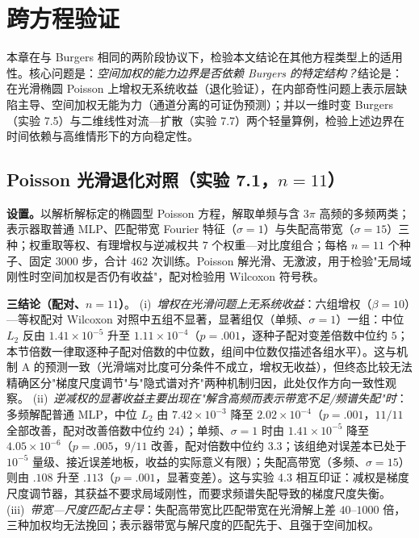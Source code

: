 \documentclass[fontset=windows,11pt]{ctexart}
\numberwithin{equation}{section}
\begin{document}
\FloatBarrier

\section{跨方程验证}\label{sec:crosseqn}

本章在与 Burgers 相同的两阶段协议下，检验本文结论在其他方程类型上的适用性。核心问题是：\emph{空间加权的能力边界是否依赖 Burgers 的特定结构？}结论是：在光滑椭圆 Poisson 上增权无系统收益（退化验证），在内部奇性问题上表示层缺陷主导、空间加权无能为力（通道分离的可证伪预测）；并以一维时变 Burgers（实验 7.5）与二维线性对流—扩散（实验 7.7）两个轻量算例，检验上述边界在时间依赖与高维情形下的方向稳定性。

\subsection{Poisson 光滑退化对照（实验 7.1，$n=11$）}\label{sec:s2a}

\textbf{设置。}以解析解标定的椭圆型 Poisson 方程，解取单频与含 $3\pi$ 高频的多频两类；表示器取普通 MLP、匹配带宽 Fourier 特征（$\sigma=1$）与失配高带宽（$\sigma=15$）三种；权重取等权、有理增权与逆减权共 $7$ 个权重—对比度组合；每格 $n=11$ 个种子、固定 $3000$ 步，合计 $462$ 次训练。Poisson 解光滑、无激波，用于检验"无局域刚性时空间加权是否仍有收益"，配对检验用 Wilcoxon 符号秩。

\noindent\textbf{三结论（配对、$n=11$）}。
(i)~\emph{增权在光滑问题上无系统收益}：六组增权（$\beta=10$）—等权配对 Wilcoxon 对照中五组不显著，显著组仅（单频、$\sigma=1$）一组：中位 $L_2$ 反由 $1.41\times10^{-5}$ 升至 $1.11\times10^{-4}$（$p=.001$，逐种子配对变差倍数中位约 $5$；本节倍数一律取逐种子配对倍数的中位数，组间中位数仅描述各组水平）。这与机制 A 的预测一致（光滑端对比度可分条件不成立，增权无收益），但终态比较无法精确区分"梯度尺度调节"与"隐式谱对齐"两种机制归因，此处仅作方向一致性观察。
(ii)~\emph{逆减权的显著收益主要出现在"解含高频而表示带宽不足/频谱失配"时}：多频解配普通 MLP，中位 $L_2$ 由 $7.42\times10^{-3}$ 降至 $2.02\times10^{-4}$（$p=.001$，$11/11$ 全部改善，配对改善倍数中位约 $24$）；单频、$\sigma=1$ 时由 $1.41\times10^{-5}$ 降至 $4.05\times10^{-6}$（$p=.005$，$9/11$ 改善，配对倍数中位约 $3.3$；该组绝对误差本已处于 $10^{-5}$ 量级、接近误差地板，收益的实际意义有限）；失配高带宽（多频、$\sigma=15$）则由 $.108$ 升至 $.113$（$p=.001$，显著变差）。这与实验 4.3 相互印证：减权是梯度尺度调节器，其获益不要求局域刚性，而要求频谱失配导致的梯度尺度失衡。
(iii)~\emph{带宽—尺度匹配占主导}：失配高带宽比匹配带宽在光滑解上差 $40$--$1000$ 倍，三种加权均无法挽回；表示器带宽与解尺度的匹配先于、且强于空间加权。
\end{document}
